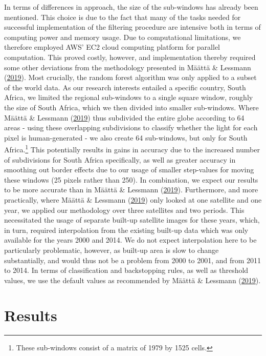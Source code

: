 \documentclass[11pt,preprint, authoryear]{elsarticle}
\numberwithin{equation}{section}
\numberwithin{figure}{section}
\numberwithin{table}{section}
\let\rmarkdownfootnote\footnote%
\def\footnote{\protect\rmarkdownfootnote}
\begin{document}
In terms of differences in approach, the size of the sub-windows has
already been mentioned. This choice is due to the fact that many of the
tasks needed for successful implementation of the filtering procedure
are intensive both in terms of computing power and memory usage. Due to
computational limitations, we therefore employed AWS' EC2 cloud
computing platform for parallel computation. This proved costly,
however, and implementation thereby required some other deviations from
the methodology presented in Määttä \& Lessmann
(\protect\hyperlink{ref-maatta}{2019}). Most crucially, the random
forest algorithm was only applied to a subset of the world data. As our
research interests entailed a specific country, South Africa, we limited
the regional sub-windows to a single square window, roughly the size of
South Africa, which we then divided into smaller sub-windows. Where
Määttä \& Lessmann (\protect\hyperlink{ref-maatta}{2019}) thus
subdivided the entire globe according to 64 areas - using these
overlapping subdivisions to classify whether the light for each pixel is
human-generated - we also create 64 sub-windows, but only for South
Africa.\footnote{These sub-windows consist of a matrix of 1979 by 1525
  cells.} This potentially results in gains in accuracy due to the
increased number of subdivisions for South Africa specifically, as well
as greater accuracy in smoothing out border effects due to our usage of
smaller step-values for moving these windows (25 pixels rather than
250). In combination, we expect our results to be more accurate than in
Määttä \& Lessmann (\protect\hyperlink{ref-maatta}{2019}). Furthermore,
and more practically, where Määttä \& Lessmann
(\protect\hyperlink{ref-maatta}{2019}) only looked at one satellite and
one year, we applied our methodology over three satellites and two
periods. This necessitated the usage of separate built-up satellite
images for these years, which, in turn, required interpolation from the
existing built-up data which was only available for the years 2000 and
2014. We do not expect interpolation here to be particularly
problematic, however, as built-up area is slow to change substantially,
and would thus not be a problem from 2000 to 2001, and from 2011 to
2014. In terms of classification and backstopping rules, as well as
threshold values, we use the default values as recommended by Määttä \&
Lessmann (\protect\hyperlink{ref-maatta}{2019}).

\hypertarget{results}{%
\section{\texorpdfstring{Results
\label{Results}}{Results }}\label{results}}
\end{document}
